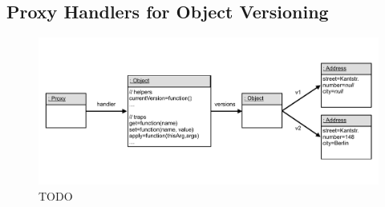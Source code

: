 \subsection{Proxy Handlers for Object Versioning}


\begin{figure}[h]
    \centering
    \includegraphics[width=\textwidth]{figures/5_implementation/2_versioningProxy.pdf}
    \caption{TODO}
    \label{fig:LoggingProxy}
\end{figure}



    
    
    





